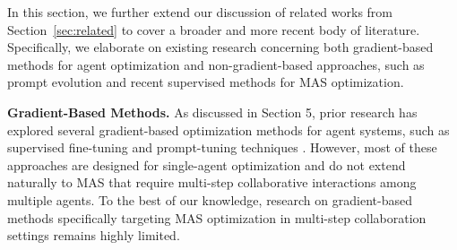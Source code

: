 



In this section, we further extend our discussion of related works from Section~\ref{sec:related} to cover a broader and more recent body of literature. Specifically, we elaborate on existing research concerning both gradient-based methods for agent optimization and non-gradient-based approaches, such as prompt evolution and recent supervised methods for MAS optimization.

\noindent \textbf{Gradient-Based Methods.} 
As discussed in Section 5, prior research has explored several gradient-based optimization methods for agent systems, such as supervised fine-tuning \cite{api_bank} and prompt-tuning techniques \cite{dsp}. However, most of these approaches are designed for single-agent optimization and do not extend naturally to MAS that require multi-step collaborative interactions among multiple agents. To the best of our knowledge, research on gradient-based methods specifically targeting MAS optimization in multi-step collaboration settings remains highly limited.

